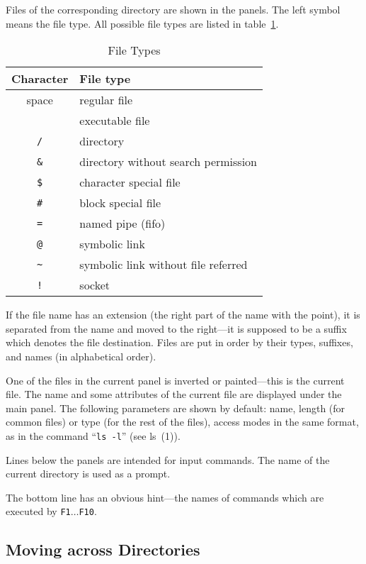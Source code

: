 Files of the corresponding directory are shown in the 
panels. The left symbol means the file type.
All possible file types are listed in table~\ref{filetypes}.

\begin{table}[bp]
\begin{center}
\begin{tabular}{|cl|}
\hline
Character & File type \\
\hline
space & regular file \\
{\tt *} & executable file \\
{\tt /} & directory \\
{\tt \&} & directory without search permission \\
{\tt \$} & character special file \\
{\tt \#} & block special file \\
{\tt =} & named pipe (fifo) \\
{\tt @} & symbolic link \\
{\tt \~{}} & symbolic link without file referred \\
{\tt !} & socket \\
\hline
\end{tabular}
\caption{File Types}
\label{filetypes}
\end{center}
\end{table}

If the file name has an extension (the right part of the name with
the point), it is separated from the name and
moved to the right---it is supposed to be a suffix which
denotes the file destination. Files are put in order by 
their types, suffixes, and names (in alphabetical order).

One of the files in the current panel is inverted or 
painted---this is the current file. The name and some
attributes of the current file are displayed under the 
main panel. The following parameters are shown by 
default: name, length (for common files) or type (for  
the rest of the files), access modes in the same format, 
as in the command ``{\tt ls~-l}'' (see ls~(1)).

Lines below the panels are intended for input commands. The
name of the current directory is used as a prompt.

The bottom line has an obvious hint---the names of
commands which are executed by {\tt F1}$\ldots${\tt F10}.

\subsection{Moving across Directories}

